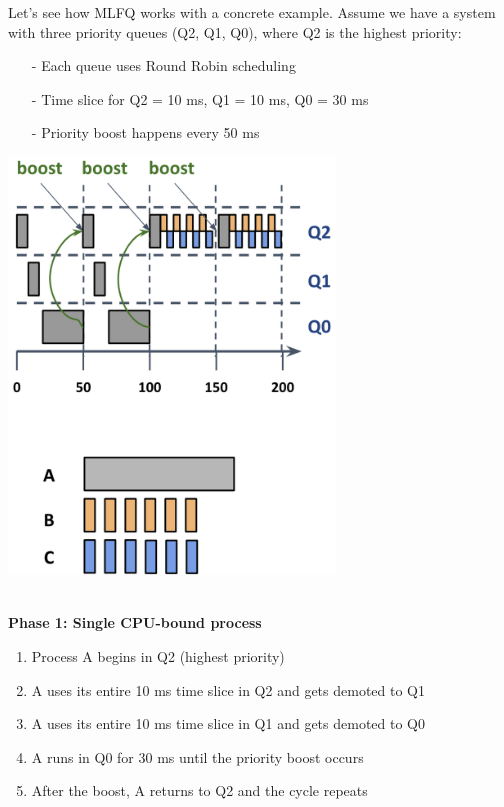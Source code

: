 \documentclass[../../compsys.tex]{subfiles}
\begin{document}
\begin{example}
\leavevmode
\upshape
Let's see how MLFQ works with a concrete example. Assume we have a system with three priority queues (Q2, Q1, Q0), where Q2 is the highest priority:
\begin{minipage}[htp]{0.45\textwidth}
\begin{itemize}
    \item[-] Each queue uses Round Robin scheduling
    \item[-] Time slice for Q2 = 10 ms, Q1 = 10 ms, Q0 = 30 ms
    \item[-] Priority boost happens every 50 ms
\end{itemize}
\end{minipage}
\hfill
\begin{minipage}[htp]{0.45\textwidth}
    \begin{center}
        \includegraphics[width=0.65\textwidth]{images/mlfq_example.png}
    \end{center}
\end{minipage}\\
\textbf{Phase 1: Single CPU-bound process}
\begin{enumerate}
    \item Process A begins in Q2 (highest priority)
    \item A uses its entire 10 ms time slice in Q2 and gets demoted to Q1
    \item A uses its entire 10 ms time slice in Q1 and gets demoted to Q0
    \item A runs in Q0 for 30 ms until the priority boost occurs
    \item After the boost, A returns to Q2 and the cycle repeats
\end{enumerate}


\end{example}
\end{document}
